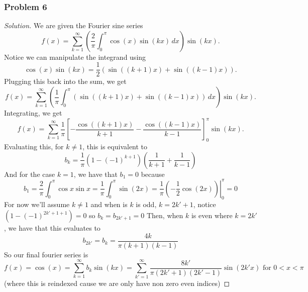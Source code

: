 \documentclass[11pt]{article}
\newcommand{\1}{\mathbf{1}}
\theoremstyle{definition}
\newenvironment{solution}{\begin{proof}[Solution]}{\end{proof}}
\begin{document}
\subsubsection*{Problem 6}
\begin{solution}
    \par We are given the Fourier sine series
\[
f(x)
=
\sum_{k=1}^{\infty}
\left(
\frac{2}{\pi}
\int_0^\pi \cos(x)\sin(kx)\,dx
\right)\sin(kx).
\]
Notice we can manipulate the integrand using
\[
\cos(x)\sin(kx)
=
\frac{1}{2}\left(\sin((k+1)x)+\sin((k-1)x)\right).
\]
Plugging this back into the sum, we get
\[
f(x)
=
\sum_{k=1}^{\infty}
\left(
\frac{1}{\pi}
\int_0^\pi
\left(\sin((k+1)x)+\sin((k-1)x)\right)\,dx
\right)\sin(kx).
\]
Integrating, we get
\[
f(x)
=
\sum_{k=1}^{\infty}
\frac{1}{\pi}
\left[
-\frac{\cos((k+1)x)}{k+1}
-\frac{\cos((k-1)x)}{k-1}
\right]_{0}^{\pi}
\sin(kx).
\]
Evaluating this, for $k \ne 1$, this is equivalent to $$b_k =
\frac{1}{\pi}\left(1 - (-1)^{k + 1}\right) \left(\frac{1}{k+1}+\frac{1}{k-1}\right)$$
And for the case $k = 1$, we have that $b_1 = 0$ because 
$$b_1 = \frac{2}{\pi}\int_{0}^{\pi }\cos x \sin x = \frac{1}{\pi}\int_{0}^{\pi}
\sin(2x) = \frac{1}{\pi} \left.\left(-\frac{1}{2}\cos(2x)\right)\right|_{0}^{\pi} = 0$$
    For now we'll assume $k \ne 1$ and when is $k$ is odd, $k = 2k' + 1$, notice $(1 - (-1)^{2k' + 1 + 1}) = 0$
    so $b_k = b_{2k' + 1} = 0$
    Then, when $k$ is even where $k = 2k'$, we have that this evaluates to $$b_{2k'} =
    b_{k} =
    \frac{4k}{\pi (k+1)(k-1)}$$
    So our final fourier series is 
    $$f(x) = \cos(x) = \sum_{k=1}^{\infty}b_k \sin(kx) = \sum_{k' = 1}^{\infty}
    \frac{8k'}{\pi (2k' + 1)(2k'- 1)}  \sin(2k'x) \text{ for } 0 < x < \pi$$ (where this is reindexed cause
    we are only have non zero even indices)
\end{solution}
\end{document}
